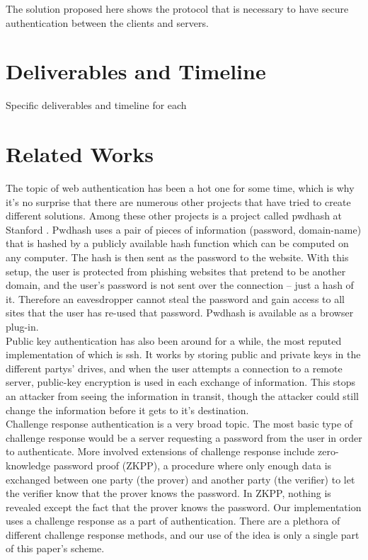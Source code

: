 \documentclass[11pt]{article}   %
\begin{document}
The solution proposed here shows the protocol that is necessary to have secure authentication between the clients and servers.


\section{Deliverables and Timeline} \label{sec:deliv}
Specific deliverables and timeline for each

\section{Related Works} \label{sec:relate}
The topic of web authentication has been a hot one for some time, which is why it's no surprise that there are numerous other projects that have tried to create different solutions.  Among these other projects is a project called pwdhash at Stanford \cite{pwdhash}.  Pwdhash uses a pair of pieces of information (password, domain-name) that is hashed by a publicly available hash function which can be computed on any computer.  The hash is then sent as the password to the website.  With this setup, the user is protected from phishing websites that pretend to be another domain, and the user's password is not sent over the connection – just a hash of it.  Therefore an eavesdropper cannot steal the password and gain access to all sites that the user has re-used that password.  Pwdhash is available as a browser plug-in.\\
Public key authentication has also been around for a while, the most reputed implementation of which is ssh.  It works by storing public and private keys in the different partys' drives, and when the user attempts a connection to a remote server, public-key encryption is used in each exchange of information.  This stops an attacker from seeing the information in transit, though the attacker could still change the information before it gets to it's destination.\\
Challenge response authentication is a very broad topic.  The most basic type of challenge response would be a server requesting a password from the user in order to authenticate.  More involved extensions of challenge response include zero-knowledge password proof (ZKPP), a procedure where only enough data is exchanged between one party (the prover) and another party (the verifier) to let the verifier know that the prover knows the password.  In ZKPP, nothing is revealed except the fact that the prover knows the password.  Our implementation uses a challenge response as a part of authentication.  There are a plethora of different challenge response methods, and our use of the idea is only a single part of this paper's scheme.


{}
\end{document}
